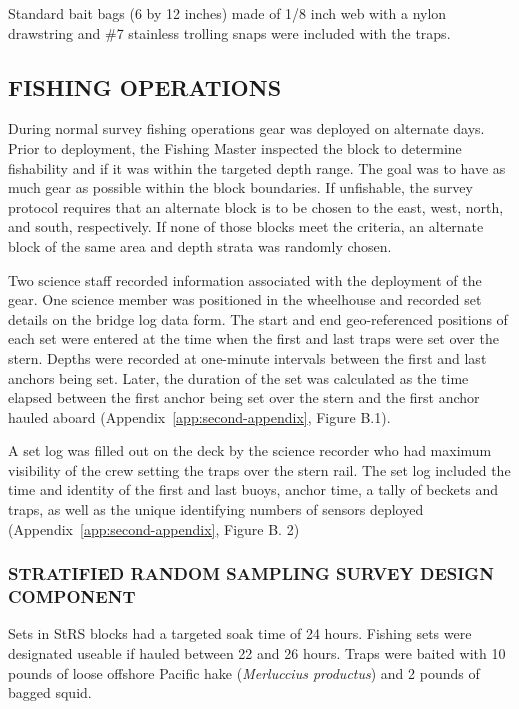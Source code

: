 \documentclass[12pt]{article}\usepackage[]{graphicx}\usepackage[]{color}
\begin{document}
Standard bait bags (6 by 12 inches) made of 1/8 inch web with a nylon drawstring and \#7 stainless trolling snaps were included with the traps.

\hypertarget{fishing-operations}{%
\subsection{FISHING OPERATIONS}\label{fishing-operations}}

During normal survey fishing operations gear was deployed on alternate days. Prior to deployment, the Fishing Master inspected the block to determine fishability and if it was within the targeted depth range. The goal was to have as much gear as possible within the block boundaries. If unfishable, the survey protocol requires that an alternate block is to be chosen to the east, west, north, and south, respectively. If none of those blocks meet the criteria, an alternate block of the same area and depth strata was randomly chosen.

Two science staff recorded information associated with the deployment of the gear. One science member was positioned in the wheelhouse and recorded set details on the bridge log data form. The start and end geo-referenced positions of each set were entered at the time when the first and last traps were set over the stern. Depths were recorded at one-minute intervals between the first and last anchors being set. Later, the duration of the set was calculated as the time elapsed between the first anchor being set over the stern and the first anchor hauled aboard (Appendix~\ref{app:second-appendix}, Figure B.1).

A set log was filled out on the deck by the science recorder who had maximum visibility of the crew setting the traps over the stern rail. The set log included the time and identity of the first and last buoys, anchor time, a tally of beckets and traps, as well as the unique identifying numbers of sensors deployed (Appendix~\ref{app:second-appendix}, Figure B. 2)

\hypertarget{stratified-random-sampling-survey-design-component}{%
\subsubsection{STRATIFIED RANDOM SAMPLING SURVEY DESIGN COMPONENT}\label{stratified-random-sampling-survey-design-component}}

Sets in StRS blocks had a targeted soak time of 24 hours. Fishing sets were designated useable if hauled between 22 and 26 hours. Traps were baited with 10 pounds of loose offshore Pacific hake (\emph{Merluccius productus}) and 2 pounds of bagged squid.
\end{document}
